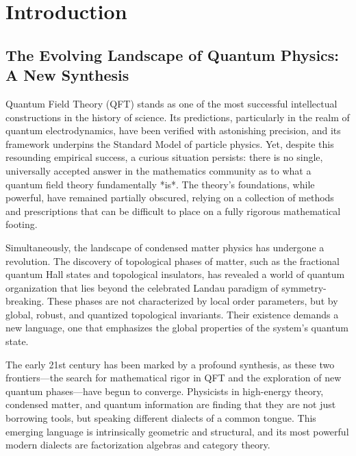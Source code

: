 
\chapter*{Introduction}

\section{The Evolving Landscape of Quantum Physics: A New Synthesis}

Quantum Field Theory (QFT) stands as one of the most successful intellectual constructions in the history of science.
Its predictions, particularly in the realm of quantum electrodynamics, have been verified with astonishing precision, and its framework underpins the Standard Model of particle physics.
Yet, despite this resounding empirical success, a curious situation persists: there is no single, universally accepted answer in the mathematics community as to what a quantum field theory fundamentally *is*.
The theory's foundations, while powerful, have remained partially obscured, relying on a collection of methods and prescriptions that can be difficult to place on a fully rigorous mathematical footing.

Simultaneously, the landscape of condensed matter physics has undergone a revolution.
The discovery of topological phases of matter, such as the fractional quantum Hall states and topological insulators, has revealed a world of quantum organization that lies beyond the celebrated Landau paradigm of symmetry-breaking.
These phases are not characterized by local order parameters, but by global, robust, and quantized topological invariants.
Their existence demands a new language, one that emphasizes the global properties of the system's quantum state.

The early 21st century has been marked by a profound synthesis, as these two frontiers—the search for mathematical rigor in QFT and the exploration of new quantum phases—have begun to converge.
Physicists in high-energy theory, condensed matter, and quantum information are finding that they are not just borrowing tools, but speaking different dialects of a common tongue.
This emerging language is intrinsically geometric and structural, and its most powerful modern dialects are factorization algebras and category theory.


